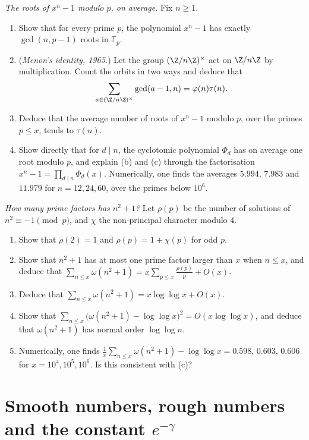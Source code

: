 \begin{exercise}[$\star\star$]\label{pb:menon}
\emph{The roots of $x^n-1$ modulo $p$, on average.} Fix $n\ge1$.
\begin{enumerate}[label=(\alph*)]
\item Show that for every prime $p$, the polynomial $x^n-1$ has exactly $\gcd(n,p-1)$ roots in $\mathbb F_p$.
\item (\emph{Menon's identity, 1965.}) Let the group $(\Z/n\Z)^\times$ act on $\Z/n\Z$ by multiplication. Count the orbits in two ways and deduce that
\[
\sum_{a\in(\Z/n\Z)^\times}\gcd(a-1,n)=\varphi(n)\tau(n).
\]
\item Deduce that the average number of roots of $x^n-1$ modulo $p$, over the primes $p\le x$, tends to $\tau(n)$.
\item Show directly that for $d\mid n$, the cyclotomic polynomial $\Phi_d$ has on average one root modulo $p$, and explain (b) and (c) through the factorisation
$x^n-1=\prod_{d\mid n}\Phi_d(x)$. Numerically, one finds the averages $5.994$, $7.983$ and $11.979$ for $n=12,24,60$, over the primes below $10^6$.
\end{enumerate}
\end{exercise}

\begin{exercise}[$\star\star\star$]\label{pb:omegapoly}
\emph{How many prime factors has $n^2+1$?} Let $\rho(p)$ be the number of solutions of $n^2\equiv-1\pmod p$, and $\chi$ the non-principal character modulo $4$.
\begin{enumerate}[label=(\alph*)]
\item Show that $\rho(2)=1$ and $\rho(p)=1+\chi(p)$ for odd $p$.
\item Show that $n^2+1$ has at most one prime factor larger than $x$ when $n\le x$, and deduce that $\sum_{n\le x}\omega(n^2+1)=x\sum_{p\le x}\frac{\rho(p)}p+O(x)$.
\item Deduce that $\sum_{n\le x}\omega(n^2+1)=x\log\log x+O(x)$.
\item Show that $\sum_{n\le x}\bigl(\omega(n^2+1)-\log\log x\bigr)^2=O(x\log\log x)$, and deduce that $\omega(n^2+1)$ has normal order $\log\log n$.
\item Numerically, one finds $\frac1x\sum_{n\le x}\omega(n^2+1)-\log\log x=0.598$, $0.603$, $0.606$ for $x=10^4,10^5,10^6$. Is this consistent with (c)?
\end{enumerate}
\end{exercise}

\section{Smooth numbers, rough numbers and the constant \texorpdfstring{$e^{-\gamma}$}{e\^{}(-gamma)}}

